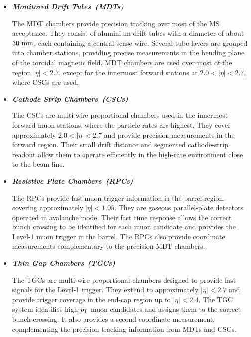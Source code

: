 \begin{itemize}
    \item \textbf{\textit{Monitored Drift Tubes~(MDTs)\quad}}
    \nopagebreak[4]

    The MDT chambers provide precision tracking over most of the MS acceptance.
    They consist of aluminium drift tubes with a diameter of about $30~\mathrm{mm}$, each containing a central sense wire.
    Several tube layers are grouped into chamber stations, providing precise measurements in the bending plane of the toroidal magnetic field.
    MDT chambers are used over most of the region $|\eta|<2.7$, except for the innermost forward stations at $2.0<|\eta|<2.7$, where CSCs are used.

    \item \textbf{\textit{Cathode Strip Chambers~(CSCs)\quad}}

    The CSCs are multi-wire proportional chambers used in the innermost forward muon stations, where the particle rates are highest.
    They cover approximately $2.0<|\eta|<2.7$ and provide precision measurements in the forward region.
    Their small drift distance and segmented cathode-strip readout allow them to operate efficiently in the high-rate environment close to the beam line.

    \item \textbf{\textit{Resistive Plate Chambers~(RPCs)\quad}}

    The RPCs provide fast muon trigger information in the barrel region, covering approximately $|\eta|<1.05$.
    They are gaseous parallel-plate detectors operated in avalanche mode.
    Their fast time response allows the correct bunch crossing to be identified for each muon candidate and provides the Level-1 muon trigger in the barrel.
    The RPCs also provide coordinate measurements complementary to the precision MDT chambers.

    \item \textbf{\textit{Thin Gap Chambers~(TGCs)\quad}}

    The TGCs are multi-wire proportional chambers designed to provide fast signals for the Level-1 trigger.
    They extend to approximately $|\eta|<2.7$ and provide trigger coverage in the end-cap region up to $|\eta|<2.4$.
    The TGC system identifies high-$p_{\mathrm{T}}$ muon candidates and assigns them to the correct bunch crossing.
    It also provides a second coordinate measurement, complementing the precision tracking information from MDTs and CSCs.
\end{itemize}



